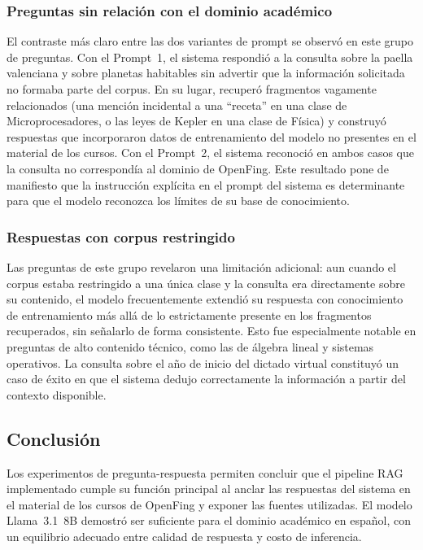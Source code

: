 \subsubsection{Preguntas sin relación con el dominio académico}

El contraste más claro entre las dos variantes de prompt se observó en este grupo de preguntas. Con el Prompt~1, el sistema respondió a la consulta sobre la paella valenciana y sobre planetas habitables sin advertir que la información solicitada no formaba parte del corpus. En su lugar, recuperó fragmentos vagamente relacionados (una mención incidental a una ``receta'' en una clase de Microprocesadores, o las leyes de Kepler en una clase de Física) y construyó respuestas que incorporaron datos de entrenamiento del modelo no presentes en el material de los cursos. Con el Prompt~2, el sistema reconoció en ambos casos que la consulta no correspondía al dominio de OpenFing. Este resultado pone de manifiesto que la instrucción explícita en el prompt del sistema es determinante para que el modelo reconozca los límites de su base de conocimiento.

\subsubsection{Respuestas con corpus restringido}

Las preguntas de este grupo revelaron una limitación adicional: aun cuando el corpus estaba restringido a una única clase y la consulta era directamente sobre su contenido, el modelo frecuentemente extendió su respuesta con conocimiento de entrenamiento más allá de lo estrictamente presente en los fragmentos recuperados, sin señalarlo de forma consistente. Esto fue especialmente notable en preguntas de alto contenido técnico, como las de álgebra lineal y sistemas operativos. La consulta sobre el año de inicio del dictado virtual constituyó un caso de éxito en que el sistema dedujo correctamente la información a partir del contexto disponible.

\subsection{Conclusión}
\label{subsection:6-QA-Conclusión}

Los experimentos de pregunta-respuesta permiten concluir que el pipeline RAG implementado cumple su función principal al anclar las respuestas del sistema en el material de los cursos de OpenFing y exponer las fuentes utilizadas. El modelo Llama~3.1~8B demostró ser suficiente para el dominio académico en español, con un equilibrio adecuado entre calidad de respuesta y costo de inferencia.

